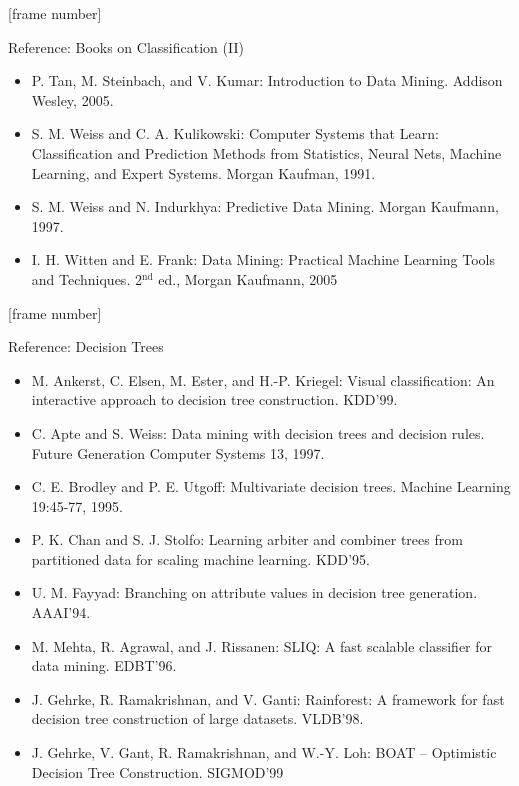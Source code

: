 \documentclass[aspectratio=169,t,table]{beamer}
\begin{document}
  {
    [frame number]
    \begin{frame}{Reference: Books on Classification (II)}
      \begin{itemize}
        \item P. Tan, M. Steinbach, and V. Kumar: Introduction to Data Mining. Addison Wesley, 2005.
        \item S. M. Weiss and C. A. Kulikowski: Computer Systems that Learn: Classification and Prediction Methods from Statistics, Neural Nets, Machine Learning, and Expert Systems. Morgan Kaufman, 1991.
        \item S. M. Weiss and N. Indurkhya: Predictive Data Mining. Morgan Kaufmann, 1997.
        \item I. H. Witten and E. Frank: Data Mining: Practical Machine Learning Tools and Techniques. 2$^\text{nd}$ ed., Morgan Kaufmann, 2005
      \end{itemize}
    \end{frame}
  }

  {
    [frame number]
    \begin{frame}{Reference: Decision Trees}
      \begin{itemize}
        \item M. Ankerst, C. Elsen, M. Ester, and H.-P. Kriegel: Visual classification: An interactive approach to decision tree construction. KDD'99.
        \item C. Apte and S. Weiss: Data mining with decision trees and decision rules. Future Generation Computer Systems 13, 1997.
        \item C. E. Brodley and P. E. Utgoff: Multivariate decision trees. Machine Learning 19:45-77, 1995.
        \item P. K. Chan and S. J. Stolfo: Learning arbiter and combiner trees from partitioned data for scaling machine learning. KDD'95.
        \item U. M. Fayyad: Branching on attribute values in decision tree generation. AAAI'94.
        \item M. Mehta, R. Agrawal, and J. Rissanen: SLIQ: A fast scalable classifier for data mining. EDBT'96.
        \item J. Gehrke, R. Ramakrishnan, and V. Ganti: Rainforest: A framework for fast decision tree construction of large datasets. VLDB'98.
        \item J. Gehrke, V. Gant, R. Ramakrishnan, and W.-Y. Loh: BOAT -- Optimistic Decision Tree Construction. SIGMOD'99
      \end{itemize}
    \end{frame}
  }
\end{document}
